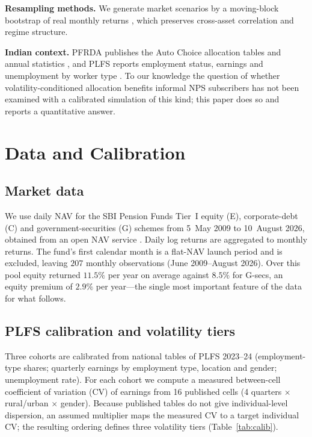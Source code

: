 \documentclass[conference]{IEEEtran}
\begin{document}
\textbf{Resampling methods.} We generate market scenarios by a moving-block bootstrap of real monthly returns \cite{efron,kunsch,politis}, which preserves cross-asset correlation and regime structure.

\textbf{Indian context.} PFRDA publishes the Auto Choice allocation tables and annual statistics \cite{pfrda}, and PLFS reports employment status, earnings and unemployment by worker type \cite{plfs}. To our knowledge the question of whether volatility-conditioned allocation benefits informal NPS subscribers has not been examined with a calibrated simulation of this kind; this paper does so and reports a quantitative answer.

\section{Data and Calibration}
\subsection{Market data}
We use daily NAV for the SBI Pension Funds Tier~I equity (E), corporate-debt (C) and government-securities (G) schemes from 5~May 2009 to 10~August 2026, obtained from an open NAV service \cite{npsnav}. Daily log returns are aggregated to monthly returns. The fund's first calendar month is a flat-NAV launch period and is excluded, leaving $207$ monthly observations (June 2009--August 2026). Over this pool equity returned $11.5\%$ per year on average against $8.5\%$ for G-secs, an equity premium of $2.9\%$ per year---the single most important feature of the data for what follows.

\subsection{PLFS calibration and volatility tiers}
Three cohorts are calibrated from national tables of PLFS 2023--24 \cite{plfs} (employment-type shares; quarterly earnings by employment type, location and gender; unemployment rate). For each cohort we compute a measured between-cell coefficient of variation (CV) of earnings from 16 published cells (4 quarters $\times$ rural/urban $\times$ gender). Because published tables do not give individual-level dispersion, an assumed multiplier maps the measured CV to a target individual CV; the resulting ordering defines three volatility tiers (Table~\ref{tab:calib}).
\end{document}
